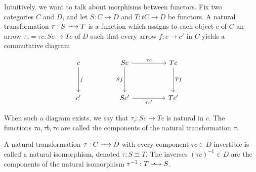 \begin{definition}
    Intuitively, we want to talk about morphisms between functors. Fix two categories $C$ and $D$, and let $S: C \to D$ and $T: tC \to D$ be functors. 
A natural transformation $\tau: S \dotarrow T$ is a function which assigns to each object $c$ of $C$ an arrow $\tau_c = \tau c : Sc \to Tc$ of $D$ such that 
every arrow $f: c \to c'$ in $C$ yields a commutative diagram 

\[\begin{tikzcd}
	c && Sc && Tc \\
	\\
	{c'} && {Sc'} && {Tc'}
	\arrow["f", from=1-1, to=3-1]
	\arrow["Sf"', from=1-3, to=3-3]
	\arrow["{\tau c}", from=1-3, to=1-5]
	\arrow["Tf", from=1-5, to=3-5]
	\arrow["{\tau c'}"', from=3-3, to=3-5]
\end{tikzcd}\]

When such a diagram exists, we say that $\tau_c : Sc \to Tc$ is natural in $c$. The functions $\tau a, \tau b, \tau c$ are called the components of the natural transformation $\tau$.
\end{definition}



\begin{definition}
    A natural transformation $\tau: C \dotarrow D$ with every component $\tau c \in D$ invertible is called a natural isomorphism, denoted $\tau: S \cong T$. The inverses
    $(\tau c)^{-1} \in D$ are the components of the natural isomorphism $\tau^{-1} : T \dotarrow S$.  
\end{definition}
